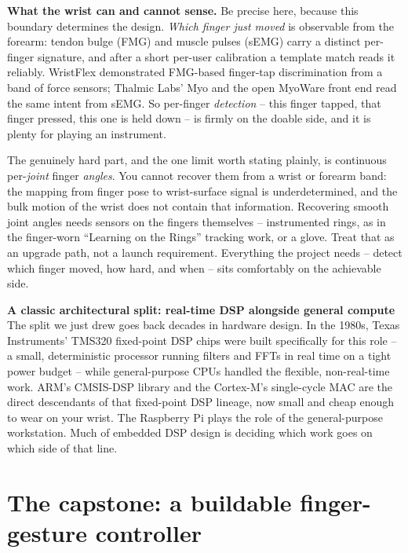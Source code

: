 \begin{goalbox}
\textbf{What the wrist can and cannot sense.} Be precise here, because this boundary determines the
design. \emph{Which finger just moved} is observable from the forearm: tendon bulge (FMG) and
muscle pulses (sEMG) carry a distinct per-finger signature, and after a short per-user calibration a
template match reads it reliably. WristFlex demonstrated FMG-based finger-tap discrimination from a
band of force sensors; Thalmic Labs' Myo and the open MyoWare front end read the same intent from
sEMG. So per-finger \emph{detection} -- this finger tapped, that finger pressed, this one is held
down -- is firmly on the doable side, and it is plenty for playing an instrument.

The genuinely hard part, and the one limit worth stating plainly, is continuous per-\emph{joint}
finger \emph{angles}. You cannot recover them from a wrist or forearm band: the mapping from finger pose to
wrist-surface signal is underdetermined, and the bulk motion of the wrist does not contain
that information. Recovering smooth joint angles needs sensors on the fingers themselves --
instrumented rings, as in the finger-worn ``Learning on the Rings'' tracking work, or a glove. Treat
that as an upgrade path, not a launch requirement. Everything the project needs -- detect
which finger moved, how hard, and when -- sits comfortably on the achievable side.
\end{goalbox}

\begin{connectionbox}
\textbf{A classic architectural split: real-time DSP alongside general compute}
The split we just drew goes back decades in hardware design. In the 1980s, Texas Instruments' TMS320 fixed-point
DSP chips were built specifically for this role -- a small, deterministic processor running
filters and FFTs in real time on a tight power budget -- while general-purpose CPUs handled the
flexible, non-real-time work. ARM's CMSIS-DSP library and the Cortex-M's single-cycle MAC are the
direct descendants of that fixed-point DSP lineage, now small and cheap enough to wear on your
wrist. The Raspberry Pi plays the role of the general-purpose workstation. Much of embedded DSP
design is deciding which work goes on which side of that line.
\end{connectionbox}

\section{The capstone: a buildable finger-gesture controller}
\label{ch40:worked}

